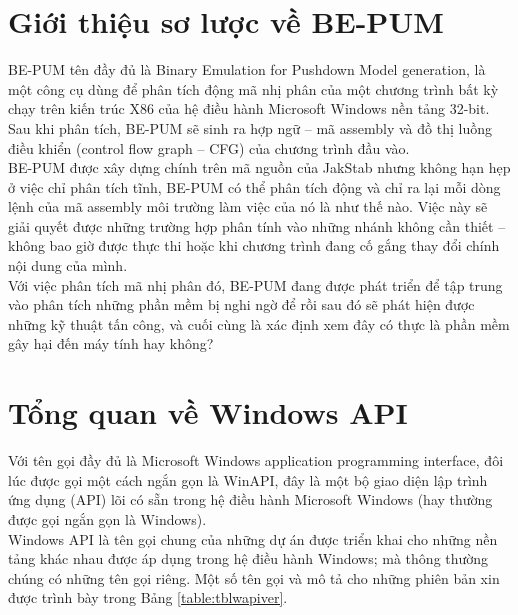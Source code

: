 

\section{Giới thiệu sơ lược về BE-PUM}

BE-PUM tên đầy đủ là Binary Emulation for Pushdown Model generation, là một công cụ dùng để phân tích động mã nhị phân của một chương trình bất kỳ chạy trên kiến trúc X86 của hệ điều hành Microsoft Windows nền tảng 32-bit. Sau khi phân tích, BE-PUM sẽ sinh ra hợp ngữ – mã assembly và đồ thị luồng điều khiển (control flow graph – CFG) của chương trình đầu vào.\\

BE-PUM được xây dựng chính trên mã nguồn của JakStab nhưng không hạn hẹp ở việc chỉ phân tích tĩnh, BE-PUM có thể phân tích động và chỉ ra lại mỗi dòng lệnh của mã assembly môi trường làm việc của nó là như thế nào. Việc này sẽ giải quyết được những trường hợp phân tính vào những nhánh không cần thiết – không bao giờ được thực thi hoặc khi chương trình đang cố gắng thay đổi chính nội dung của mình.\\

Với việc phân tích mã nhị phân đó, BE-PUM đang được phát triển để tập trung vào phân tích những phần mềm bị nghi ngờ để rồi sau đó sẽ phát hiện được những kỹ thuật tấn công, và cuối cùng là xác định xem đây có thực là phần mềm gây hại đến máy tính hay không?\\

\section {Tổng quan về Windows API}

Với tên gọi đầy đủ là Microsoft Windows application programming interface, đôi lúc được gọi một cách ngắn gọn là WinAPI, đây là một bộ giao diện lập trình ứng dụng (API) lõi có sẵn trong hệ điều hành Microsoft Windows (hay thường được gọi ngắn gọn là Windows).\\

Windows API là tên gọi chung của những dự án được triển khai cho những nền tảng khác nhau được áp dụng trong hệ điều hành Windows; mà thông thường chúng có những tên gọi riêng. Một số tên gọi và mô tả cho những phiên bản xin được trình bày trong Bảng \ref{table:tblwapiver}.


